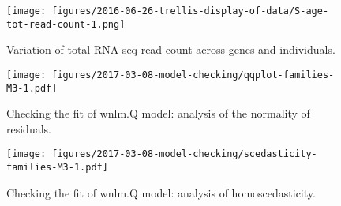\documentclass[letterpaper]{article}
\begin{document}
\begin{figure}[h]
\begin{center}
\texttt{[image: figures/2016-06-26-trellis-display-of-data/S-age-tot-read-count-1.png]}
\end{center}
\caption{Variation of total RNA-seq read count across genes and individuals.}
\label{fig:weight-of-evidence}
\end{figure}

\begin{figure}[h]
\begin{center}
\texttt{[image: figures/2017-03-08-model-checking/qqplot-families-M3-1.pdf]}
\end{center}
\caption{
Checking the fit of wnlm.Q model: analysis of the normality of residuals.
}
\label{fig:qqnorm-mixed}
\end{figure}

\begin{figure}[h]
\begin{center}
\texttt{[image: figures/2017-03-08-model-checking/scedasticity-families-M3-1.pdf]}
\end{center}
\caption{
Checking the fit of wnlm.Q model: analysis of homoscedasticity.
}
\label{fig:homoscedas-mixed}
\end{figure}
\end{document}
